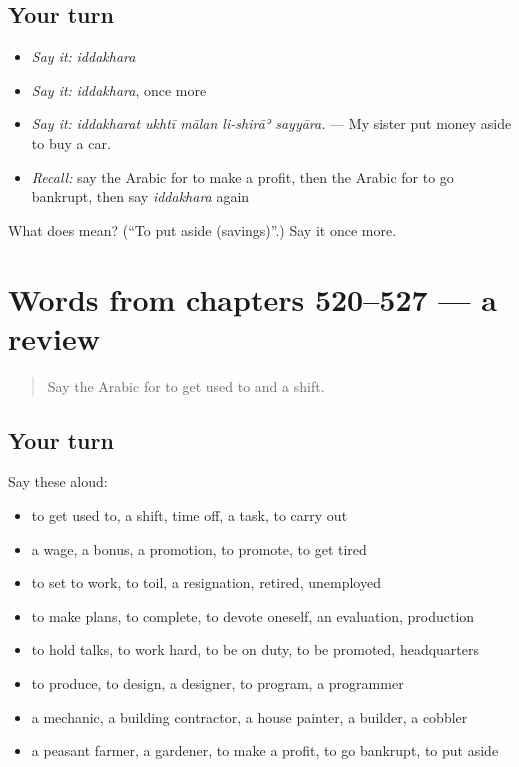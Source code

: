 \subsection*{Your turn}
\begin{itemize}
\raggedright
  \item \emph{Say it:} \emph{iddakhara}
  \item \emph{Say it:} \emph{iddakhara}, once more
  \item \emph{Say it:} \emph{iddakharat ukhtī mālan li-shirāʾ sayyāra.} — My sister put money aside to buy a car.
  \item \emph{Recall:} say the Arabic for to make a profit, then the Arabic for to go bankrupt, then say \emph{iddakhara} again
\end{itemize}

\begin{tcolorbox}[breakable,colback=teal!4,colframe=teal!35!black,title={Before you move on}]
What does  mean? (\textquotedblleft{}To put aside (savings)\textquotedblright{}.) Say it once more.
\end{tcolorbox}
\section[(dialogue)]{Words from chapters 520–527 — a review}

\label{lesson:AR-R527-review-520-527}



\begin{quote}
Say the Arabic for to get used to and a shift.
\end{quote}

\subsection*{Your turn}
Say these aloud:

\begin{itemize}
\raggedright
  \item to get used to, a shift, time off, a task, to carry out
  \item a wage, a bonus, a promotion, to promote, to get tired
  \item to set to work, to toil, a resignation, retired, unemployed
  \item to make plans, to complete, to devote oneself, an evaluation, production
  \item to hold talks, to work hard, to be on duty, to be promoted, headquarters
  \item to produce, to design, a designer, to program, a programmer
  \item a mechanic, a building contractor, a house painter, a builder, a cobbler
  \item a peasant farmer, a gardener, to make a profit, to go bankrupt, to put aside
\end{itemize}

